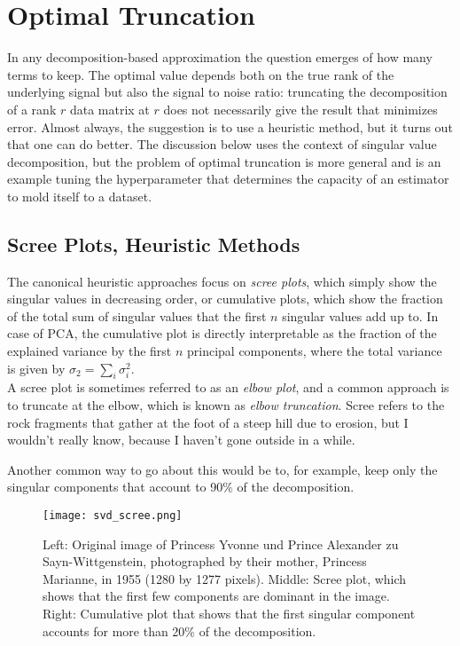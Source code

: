\section{Optimal Truncation}
\label{sec:truncation}

In any decomposition-based approximation the question emerges of how many terms to keep. The optimal value depends both on the true rank of the underlying signal but also the signal to noise ratio: truncating the decomposition of a rank $r$ data matrix at $r$ does not necessarily give the result that minimizes error. Almost always, the suggestion is to use a heuristic method, but it turns out that one can do better. The discussion below uses the context of singular value decomposition, but the problem of optimal truncation is more general and is an example tuning the hyperparameter that determines the capacity of an estimator to mold itself to a dataset.


\subsection{Scree Plots, Heuristic Methods}
\label{sec:scree}
The canonical heuristic approaches focus on \textit{scree plots}, which simply show the singular values in decreasing order, or cumulative plots, which show the fraction of the total sum of singular values that the first $n$ singular values add up to. In case of PCA, the cumulative plot is directly interpretable as the fraction of the explained variance by the first $n$ principal components, where the total variance is given by $\sigma_2 = \sum_i \sigma_i^2$. \\

A scree plot is sometimes referred to as an \textit{elbow plot}, and a common approach is to truncate at the elbow, which is known as \textit{elbow truncation}. Scree refers to the rock fragments that gather at the foot of a steep hill due to erosion, but I wouldn't really know, because I haven't gone outside in a while. 

Another common way to go about this would be to, for example, keep only the singular components that account to 90\% of the decomposition.

\begin{figure}
\centering
    \texttt{[image: svd\_scree.png]}
    \caption{Left: Original image of Princess Yvonne und Prince Alexander zu Sayn-Wittgenstein, photographed by their mother, Princess Marianne, in 1955 (1280 by 1277 pixels). Middle: Scree plot, which shows that the first few components are dominant in the image. Right: Cumulative plot that shows that the first singular component accounts for more than 20\% of the decomposition.}
    \label{fig:svd_scree}
\end{figure}


